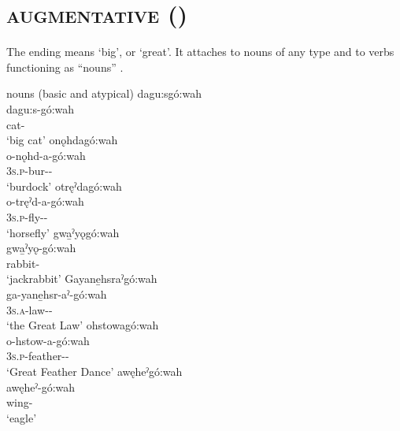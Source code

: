 \section{ \textsc{augmentative} \textup{(}{\augmentative}\textup{)}} \label{-go:wah}
The  \textsc{\augmentative} ending means ‘big’, or ‘great’. It attaches to nouns of any type  and to verbs functioning as “nouns” .
 
\ea\label{ex:gowex} nouns (basic and atypical)
\ea dagu:sgó:wah\\
\gll dagu:s-gó:wah\\
 cat-\textsc{\augmentative}\\
\glt `big cat'
\ex onǫhdagó:wah\\
\gll o-nǫhd-a-gó:wah\\
 \textsc{3s.p}-bur-{\joinerA}-{\augmentative}\\
\glt `burdock'
\ex otręˀdagó:wah\\
\gll o-tręˀd-a-gó:wah\\
 \textsc{3s.p}-fly-{\joinerA}-{\augmentative}\\
\glt `horsefly'
\ex gwa̱ˀyǫgó:wah\\
\gll gwa̱ˀyǫ-gó:wah\\
 rabbit-\textsc{\augmentative}\\
\glt `jackrabbit'
\ex Gayane̱hsraˀgó:wah\\
\gll ga-yane̱hsr-aˀ-gó:wah\\
 \textsc{3s.a}-law-{\joinerA}-{\augmentative}\\
\glt `the Great Law'
\ex ohstowagó:wah\\
\gll o-hstow-a-gó:wah\\
 \textsc{3s.p}-feather-{\joinerA}-{\augmentative}\\
\glt `Great Feather Dance'
\ex awęheˀgó:wah\\
\gll awęheˀ-gó:wah\\
 wing-{\augmentative}\\
\glt `eagle'
\z
\z

